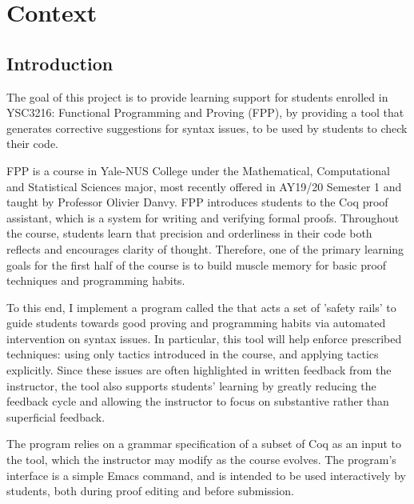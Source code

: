 
\chapter{Context} %

\label{context} %


\section{Introduction}
The goal of this project is to provide learning support for students enrolled in YSC3216: Functional Programming and Proving (FPP), by providing a tool that generates corrective suggestions for syntax issues, to be used by students to check their code.

FPP is a course in Yale-NUS College under the Mathematical, Computational and Statistical Sciences major, most recently offered in AY19/20 Semester 1 and taught by Professor Olivier Danvy. FPP introduces students to the Coq proof assistant, which is a system for writing and verifying formal proofs. Throughout the course, students learn that precision and orderliness in their code both reflects and encourages clarity of thought. Therefore, one of the primary learning goals for the first half of the course is to build muscle memory for basic proof techniques and programming habits.

To this end, I implement a program called the  that acts a set of ’safety rails’ to guide students towards good proving and programming habits via automated intervention on syntax issues. In particular, this tool will help enforce prescribed techniques: using only tactics introduced in the course, and applying tactics explicitly. Since these issues are often highlighted in written feedback from the instructor, the tool also supports students' learning by greatly reducing the feedback cycle and allowing the instructor to focus on substantive rather than superficial feedback.

The program relies on a grammar specification of a subset of Coq as an input to the tool, which the instructor may modify as the course evolves. The program's interface is a simple Emacs command, and is intended to be used interactively by students, both during proof editing and before submission.

